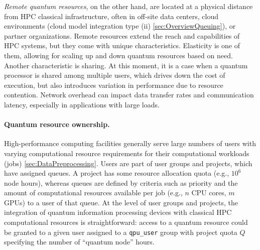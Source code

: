 \textit{Remote quantum resources}, on the other hand, are located at a physical distance from HPC classical infrastructure, often in off-site data centers, cloud environments (cloud model integration type (ii) \ref{sec:OverviewQueuing}), or partner organizations. Remote resources extend the reach and capabilities of HPC systems, but they come with unique characteristics. Elasticity is one of them, allowing for scaling up and down quantum resources based on need. Another characteristic is sharing. At this moment, it is a case when a quantum processor is shared among multiple users, which drives down the cost of execution, but also introduces variation in performance due to resource contention. Network overhead can impact data transfer rates and communication latency, especially in applications with large loads. 

\paragraph{\textbf{Quantum resource ownership.}} 
\label{sec:WM_ResourceOwnership}


High-performance computing facilities generally serve large numbers of users with varying computational resource requirements for their computational workloads (jobs) \ref{sec:DataPreprocessing}.
Users are part of user groups and projects, which have assigned queues.
A project has some resource allocation quota (e.g., $10^{6}$ node hours), whereas queues are defined by criteria such as priority and the amount of computational resources available per job (e.g., $n$ CPU cores, $m$ GPUs) to a user of that queue.
At the level of user groups and projects, the integration of quantum information processing devices with classical HPC computational resources is straightforward: access to a quantum resource could be granted to a given user assigned to a \texttt{qpu\_user} group with project quota $Q$ specifying the number of ``quantum node'' hours.



